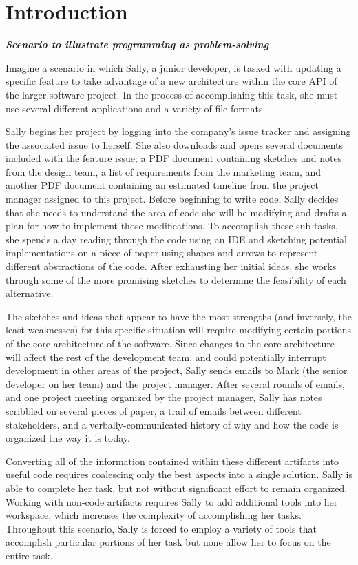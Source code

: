 \documentclass{ppig}
\newcommand{\bold}[1]{\textit{\textbf{\color{aoblue}#1}}} %
\begin{document}
\section{Introduction}
\bold{Scenario to illustrate programming as problem-solving}\vspace*{-0.4\baselineskip}

Imagine a scenario in which Sally, a junior developer, is tasked with updating a specific feature to take advantage of a new architecture within the core API of the larger software project. In the process of accomplishing this task, she must use several different applications and a variety of file formats.

Sally begins her project by logging into the company's issue tracker and assigning the associated issue to herself.
She also downloads and opens several documents included with the feature issue; a PDF document containing sketches and notes from the design team, a list of requirements from the marketing team, and another PDF document containing an estimated timeline from the project manager assigned to this project.
Before beginning to write code, Sally decides that she needs to understand the area of code she will be modifying and drafts a plan for how to implement those modifications.
To accomplish these sub-tasks, she spends a day reading through the code using an IDE and sketching potential implementations on a piece of paper using shapes and arrows to represent different abstractions of the code.
After exhausting her initial ideas, she works through some of the more promising sketches to determine the feasibility of each alternative.

The sketches and ideas that appear to have the most strengths (and inversely, the least weaknesses) for this specific situation will require modifying certain portions of the core architecture of the software.
Since changes to the core architecture will affect the rest of the development team, and could potentially interrupt development in other areas of the project, Sally sends emails to Mark (the senior developer on her team) and the project manager.
After several rounds of emails, and one project meeting organized by the project manager, Sally has notes scribbled on several pieces of paper, a trail of emails between different stakeholders, and a verbally-communicated history of why and how the code is organized the way it is today.

Converting all of the information contained within these different artifacts into useful code requires coalescing only the best aspects into a single solution.
Sally is able to complete her task, but not without significant effort to remain organized.
Working with non-code artifacts requires Sally to add additional tools into her workspace, which increases the complexity of accomplishing her tasks.
Throughout this scenario, Sally is forced to employ a variety of tools that accomplish particular portions of her task but none allow her to focus on the entire task.
\end{document}
